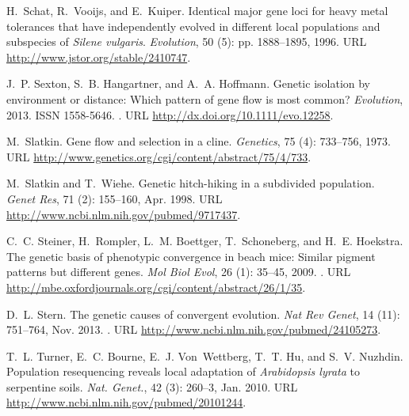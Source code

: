 \documentclass[10pt,letterpaper]{article}
\begin{document}
\begin{thebibliography}{68}
H.~Schat, R.~Vooijs, and E.~Kuiper.
\newblock Identical major gene loci for heavy metal tolerances that have
  independently evolved in different local populations and subspecies of
  \textit{{Silene} vulgaris}.
\newblock \emph{Evolution}, 50 (5): pp. 1888--1895, 1996.
\newblock URL \url{http://www.jstor.org/stable/2410747}.

J.~P. Sexton, S.~B. Hangartner, and A.~A. Hoffmann.
\newblock Genetic isolation by environment or distance: Which pattern of gene
  flow is most common?
\newblock \emph{Evolution}, 2013.
\newblock ISSN 1558-5646.
\newblock {}.
\newblock URL \url{http://dx.doi.org/10.1111/evo.12258}.

M.~Slatkin.
\newblock Gene flow and selection in a cline.
\newblock \emph{Genetics}, 75 (4): 733--756, 1973.
\newblock URL \url{http://www.genetics.org/cgi/content/abstract/75/4/733}.

M.~Slatkin and T.~Wiehe.
\newblock Genetic hitch-hiking in a subdivided population.
\newblock \emph{Genet Res}, 71 (2): 155--160, Apr. 1998.
\newblock URL \url{http://www.ncbi.nlm.nih.gov/pubmed/9717437}.

C.~C. Steiner, H.~Rompler, L.~M. Boettger, T.~Schoneberg, and H.~E. Hoekstra.
\newblock The genetic basis of phenotypic convergence in beach mice: Similar
  pigment patterns but different genes.
\newblock \emph{Mol Biol Evol}, 26 (1): 35--45, 2009.
\newblock {}.
\newblock URL \url{http://mbe.oxfordjournals.org/cgi/content/abstract/26/1/35}.

D.~L. Stern.
\newblock The genetic causes of convergent evolution.
\newblock \emph{Nat Rev Genet}, 14 (11): 751--764, Nov. 2013.
\newblock {}.
\newblock URL \url{http://www.ncbi.nlm.nih.gov/pubmed/24105273}.

T.~L. Turner, E.~C. Bourne, E.~J. Von~Wettberg, T.~T. Hu, and S.~V. Nuzhdin.
\newblock Population resequencing reveals local adaptation of
  \textit{{Arabidopsis} lyrata} to serpentine soils.
\newblock \emph{Nat. Genet.}, 42 (3): 260--3, Jan. 2010.
\newblock URL \url{http://www.ncbi.nlm.nih.gov/pubmed/20101244}.


\end{thebibliography}
\end{document}
